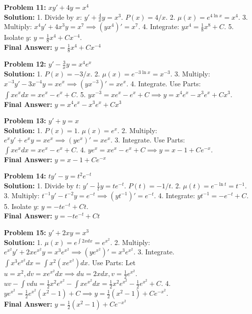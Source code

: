 \documentclass[11pt]{article}
\begin{document}
\vspace{10pt}
\textbf{Problem 11:} $x y' + 4y = x^4$ \\
\textbf{Solution:} 
1. Divide by $x$: $y' + \frac{4}{x}y = x^3$. $P(x) = 4/x$. 
2. $\mu(x) = e^{4\ln x} = x^4$. 
3. Multiply: $x^4 y' + 4x^3 y = x^7 \implies (y x^4)' = x^7$. 
4. Integrate: $y x^4 = \frac{1}{8}x^8 + C$. 
5. Isolate $y$: $y = \frac{1}{8}x^4 + Cx^{-4}$. \\
\textbf{Final Answer:} $y = \frac{1}{8}x^4 + Cx^{-4}$

\vspace{10pt}
\textbf{Problem 12:} $y' - \frac{3}{x}y = x^4 e^x$ \\
\textbf{Solution:} 
1. $P(x) = -3/x$. 
2. $\mu(x) = e^{-3\ln x} = x^{-3}$. 
3. Multiply: $x^{-3}y' - 3x^{-4}y = x e^x \implies (yx^{-3})' = x e^x$. 
4. Integrate. Use Parts: $\int x e^x dx = x e^x - e^x + C$. 
5. $y x^{-3} = x e^x - e^x + C \implies y = x^4 e^x - x^3 e^x + C x^3$. \\
\textbf{Final Answer:} $y = x^4 e^x - x^3 e^x + C x^3$

\vspace{10pt}
\textbf{Problem 13:} $y' + y = x$ \\
\textbf{Solution:} 
1. $P(x) = 1$. $\mu(x) = e^x$. 
2. Multiply: $e^x y' + e^x y = x e^x \implies (ye^x)' = xe^x$. 
3. Integrate. Use Parts: $\int xe^x dx = xe^x - e^x + C$. 
4. $y e^x = xe^x - e^x + C \implies y = x - 1 + Ce^{-x}$. \\
\textbf{Final Answer:} $y = x - 1 + Ce^{-x}$

\vspace{10pt}
\textbf{Problem 14:} $t y' - y = t^2 e^{-t}$ \\
\textbf{Solution:} 
1. Divide by $t$: $y' - \frac{1}{t}y = t e^{-t}$. $P(t) = -1/t$. 
2. $\mu(t) = e^{-\ln t} = t^{-1}$. 
3. Multiply: $t^{-1}y' - t^{-2}y = e^{-t} \implies (y t^{-1})' = e^{-t}$. 
4. Integrate: $y t^{-1} = -e^{-t} + C$. 
5. Isolate $y$: $y = -te^{-t} + Ct$. \\
\textbf{Final Answer:} $y = -te^{-t} + Ct$

\vspace{10pt}
\textbf{Problem 15:} $y' + 2xy = x^3$ \\
\textbf{Solution:} 
1. $\mu(x) = e^{\int 2x dx} = e^{x^2}$. 
2. Multiply: $e^{x^2}y' + 2xe^{x^2}y = x^3 e^{x^2} \implies (ye^{x^2})' = x^3 e^{x^2}$. 
3. Integrate. $\int x^3 e^{x^2} dx = \int x^2 (x e^{x^2}) dx$. Use Parts: Let $u=x^2, dv = x e^{x^2} dx \implies du = 2x dx, v = \frac{1}{2}e^{x^2}$. 
   $uv - \int v du = \frac{1}{2}x^2 e^{x^2} - \int x e^{x^2} dx = \frac{1}{2}x^2 e^{x^2} - \frac{1}{2}e^{x^2} + C$. 
4. $y e^{x^2} = \frac{1}{2}e^{x^2}(x^2 - 1) + C \implies y = \frac{1}{2}(x^2 - 1) + Ce^{-x^2}$. \\
\textbf{Final Answer:} $y = \frac{1}{2}(x^2 - 1) + Ce^{-x^2}$
\end{document}
